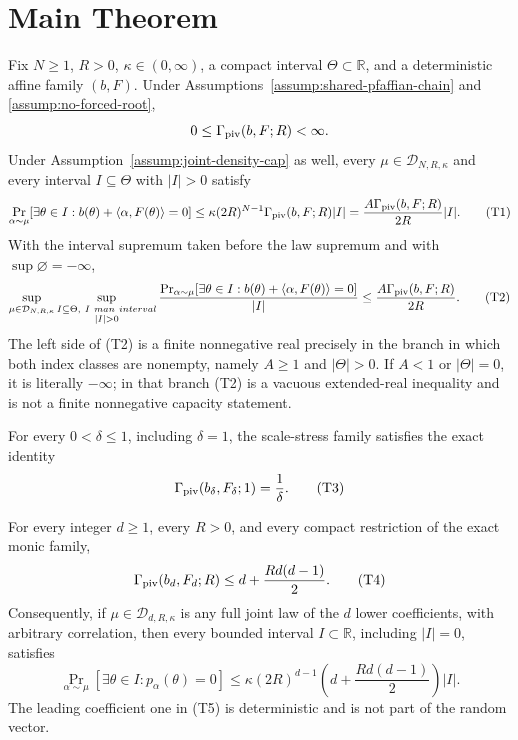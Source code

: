 \section{Main Theorem}

\begin{theorem}
\label{thm:main}
Fix $N\geq1$, $R>0$, $\kappa\in(0,\infty)$, a compact interval
$\Theta\subset\mathbb R$, and a deterministic affine family $(b,F)$.
Under Assumptions~\ref{assump:shared-pfaffian-chain} and
\ref{assump:no-forced-root},
\[
0\leq\Gamma_{\rm piv}(b,F;R)<\infty.
\]
Under Assumption~\ref{assump:joint-density-cap} as well, every
$\mu\in\mathcal D_{N,R,\kappa}$ and every interval $I\subseteq\Theta$
with $|I|>0$ satisfy
\[
\Pr_{\alpha\sim\mu}\!\left[\exists\theta\in I:
 b(\theta)+\langle\alpha,F(\theta)\rangle=0\right]
\leq
\kappa(2R)^{N-1}\Gamma_{\rm piv}(b,F;R)|I|
=\frac{A\Gamma_{\rm piv}(b,F;R)}{2R}|I|.
\tag{T1}
\]
With the interval supremum taken before the law supremum and with
$\sup\varnothing=-\infty$,
\[
\sup_{\mu\in\mathcal D_{N,R,\kappa}}
\sup_{\substack{I\subseteq\Theta,\ I\ {
m an\ interval}\\|I|>0}}
\frac{\Pr_{\alpha\sim\mu}[\exists\theta\in I:
 b(\theta)+\langle\alpha,F(\theta)\rangle=0]}{|I|}
\leq\frac{A\Gamma_{\rm piv}(b,F;R)}{2R}.
\tag{T2}
\]
The left side of \textup{(T2)} is a finite nonnegative real precisely in
the branch in which both index classes are nonempty, namely
$A\geq1$ and $|\Theta|>0$.  If $A<1$ or $|\Theta|=0$, it is literally
$-\infty$; in that branch \textup{(T2)} is a vacuous extended-real
inequality and is not a finite nonnegative capacity statement.

For every $0<\delta\leq1$, including $\delta=1$, the scale-stress family
satisfies the exact identity
\[
\Gamma_{\rm piv}(b_\delta,F_\delta;1)=\frac1\delta.
\tag{T3}
\]

For every integer $d\geq1$, every $R>0$, and every compact restriction of
the exact monic family,
\[
\Gamma_{\rm piv}(b_d,F_d;R)
\leq d+\frac{R d(d-1)}2.
\tag{T4}
\]
Consequently, if $\mu\in\mathcal D_{d,R,\kappa}$ is any full joint law of
the $d$ lower coefficients, with arbitrary correlation, then every bounded
interval $I\subset\mathbb R$, including $|I|=0$, satisfies
\[
\Pr_{\alpha\sim\mu}\!\left[\exists\theta\in I:p_\alpha(\theta)=0\right]
\leq
\kappa(2R)^{d-1}
\left(d+\frac{R d(d-1)}2\right)|I|.
\tag{T5}
\]
The leading coefficient one in \textup{(T5)} is deterministic and is not
part of the random vector.


\end{theorem}
